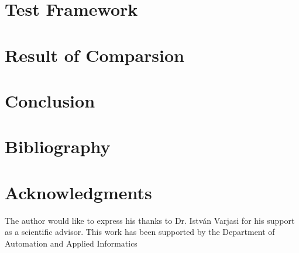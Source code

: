 \documentclass[twoside,b5paper,10pt]{article}
\begin{document}
\section{Test Framework}
\label{sec:test_framework}

\section{Result of Comparsion}
\label{sec:results}

\section{Conclusion}
\label{sec:conclusion}


\section{Bibliography}
\label{sec:bib}

\section*{Acknowledgments}
 { \small The author would like to express his thanks to Dr. István Varjasi for his support as a scientific advisor.
This work has been supported by the Department of Automation and Applied Informatics}

\end{document}
